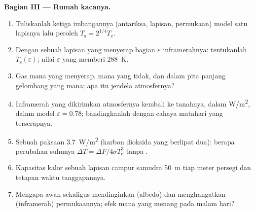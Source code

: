 \begin{problem}
\textbf{Bagian III --- Rumah kacanya.}
\begin{enumerate}[resume]
  \item Tuliskanlah ketiga imbangannya (antariksa, lapisan, permukaan)
        model satu lapisnya lalu peroleh $T_{\text{s}} = 2^{1/4}T_{\text{e}}$.
  \item Dengan sebuah lapisan yang menyerap bagian $\varepsilon$
        inframerahnya: tentukanlah $T_{\text{s}}(\varepsilon)$; nilai $\varepsilon$
        yang memberi \qty{288}{K}.
  \item Gas mana yang menyerap, mana yang tidak, dan dalam pita panjang
        gelombang yang mana; apa itu jendela atmosfernya?
  \item Inframerah yang dikirimkan atmosfernya kembali ke tanahnya,
        dalam \unit{W/m^2}, dalam model $\varepsilon = 0.78$; bandingkanlah dengan
        cahaya matahari yang terserapnya.
  \item Sebuah paksaan \qty{3.7}{W/m^2} (karbon dioksida yang berlipat dua):
        berapa perubahan suhunya $\Delta T = \Delta F/4\sigma T_{\text{e}}^3$
        tanpa .
  \item Kapasitas kalor sebuah lapisan campur samudra \qty{50}{m} tiap meter
        persegi dan tetapan waktu tanggapannya.
  \item Mengapa awan sekaligus mendinginkan (albedo) dan menghangatkan (inframerah)
        permukaannya; efek mana yang menang pada malam hari?
\end{enumerate}


\end{problem}
